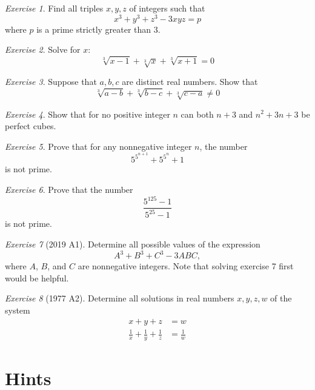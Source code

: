 \documentclass{article}
\theoremstyle{definition}
\theoremstyle{remark}
\newtheorem{exercise}{Exercise}
\begin{document}
\begin{exercise}
Find all triples $x,y,z$ of integers such that 
\begin{equation*}
    x^3 + y^3 + z^3 -3xyz = p
\end{equation*}
where $p$ is a prime strictly greater than 3.
\end{exercise}

\begin{exercise}
Solve for $x$:
\[\sqrt[3]{x-1} + \sqrt[3]{x}  + \sqrt[3]{x+1} = 0\]
\end{exercise}

\begin{exercise}
Suppose that $a,b,c$ are distinct real numbers. Show that 
\begin{equation*}
    \sqrt[3]{a - b} + \sqrt[3]{b - c}  + \sqrt[3]{c - a} \neq 0
\end{equation*}
\end{exercise}

\begin{exercise}
Show that for no positive integer $n$ can both $n+3$ and $n^2+3n+3$ be perfect cubes.
\end{exercise}

\begin{exercise}
Prove that for any nonnegative integer $n$, the number
\[5^{5^{n+1}}+5^{5^n} +1\] is not prime.
\end{exercise}

\begin{exercise}
Prove that the number
\[\frac{5^{125}-1}{5^{25}-1}\]
is not prime.
\end{exercise}

\begin{exercise}[2019 A1]
Determine all possible values of the expression
\[A^3+B^3+C^3-3ABC,\]
where \(A\), \(B\), and \(C\) are nonnegative integers. Note that solving exercise 7 first would be helpful.
\end{exercise}

\begin{exercise}[1977 A2]
Determine all solutions in real numbers $x,y,z,w$ of the system
\begin{align*}
    x+y+z&= w \\
    \frac{1}{x}+\frac{
    1}{y}+\frac{1}{z} &= \frac{1}{w}
\end{align*}
\end{exercise}

\pagebreak

\section{Hints}
\end{document}
